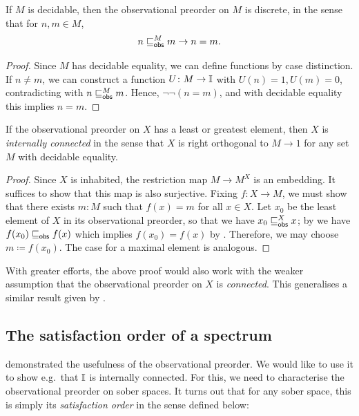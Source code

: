 \begin{lemma}[\AxiomNT]\label{lem:obs-preord-on-set-with-decidable-equality}
  If $M$ is decidable, then the observational preorder on $M$ is discrete, in the sense that for $n,m \in M$,
  \[ n \obsle[M] m \to n = m\text{.} \]
\end{lemma}
\begin{proof}
  Since $M$ has decidable equality, we can define functions by case distinction. If $n \neq m$, we can construct a function $U \colon M \to \mathbb{I}$ with $U(n) = 1,U(m) = 0$, contradicting with $n \obsle[M] m$. Hence, $\neg\neg (n=m)$, and with decidable equality this implies $n = m$.
\end{proof}


\begin{corollary}[\AxiomNT]\label{cor:connectedpreservediscrete}
  If the observational preorder on $X$ has a least or greatest element, then $X$ is \emph{internally connected} in the sense that $X$ is right orthogonal to $M \to 1$ for any set $M$ with decidable equality.
\end{corollary}
\begin{proof}
  Since $X$ is inhabited, the restriction map $M \to M^X$ is an embedding. It suffices to show that this map is also surjective. Fixing $f\colon X\to M$, we must show that there exists $m:M$ such that $f(x) = m$ for all $x\in X$. Let $x_0$ be the least element of $X$ in its observational preorder, so that we have $x_0\obsle[X] x$; by  we have $f(x_0) \obsle f(x)$ which implies $f(x_0) = f(x)$ by . Therefore, we may choose $m\coloneq f(x_0)$. The case for a maximal element is analogous.
\end{proof}

\begin{remark}
  With greater efforts, the above proof would also work with the weaker assumption that the observational preorder on $X$ is \emph{connected}. This generalises a similar result given by \citet[Prop.~4.4.1]{hyland_first_2006}.
\end{remark}


\subsection{The satisfaction order of a spectrum}

 demonstrated the usefulness of the observational preorder. We would like to use it to show e.g.\ that $\mathbb{I}$ is internally connected. For this, we need to characterise the observational preorder on sober spaces. It turns out that for any sober space, this is simply its \emph{satisfaction order} in the sense defined below:


